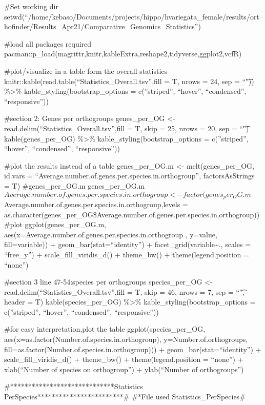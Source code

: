 \documentclass[
]{article}
\author{}
\date{\vspace{-2.5em}}
\begin{document}
\#Set working dir
setwd(``/home/kebaso/Documents/projects/hippo/hvariegata\_female/results/orthofinder/Results\_Apr21/Comparative\_Genomics\_Statistics'')

\#load all packages required
pacman::p\_load(magrittr,knitr,kableExtra,reshape2,tidyverse,ggplot2,vcfR)

\#plot/visualize in a table form the overall statistics
knitr::kable(read.table(``Statistics\_Overall.tsv'',fill = T, nrows =
24, sep = ``\t")) \%\textgreater\% kable\_styling(bootstrap\_options =
c(''striped'', ``hover'', ``condensed'', ``responsive''))

\#section 2: Genes per orthogroups genes\_per\_OG \textless-
read.delim(``Statistics\_Overall.tsv'',fill = T, skip = 25, nrows = 20,
sep = ``\t") kable(genes\_per\_OG) \%\textgreater\%
kable\_styling(bootstrap\_options = c(''striped'', ``hover'',
``condensed'', ``responsive''))

\#plot the results instead of a table genes\_per\_OG.m \textless-
melt(genes\_per\_OG, id.vars =
``Average.number.of.genes.per.species.in.orthogroup'', factorsAsStrings
= T) \#genes\_per\_OG.m
genes\_per\_OG.m\(Average.number.of.genes.per.species.in.orthogroup <- factor(genes_per_OG.m\)Average.number.of.genes.per.species.in.orthogroup,levels
=
as.character(genes\_per\_OG\$Average.number.of.genes.per.species.in.orthogroup))
\#plot ggplot(genes\_per\_OG.m,
aes(x=Average.number.of.genes.per.species.in.orthogroup , y=value,
fill=variable)) + geom\_bar(stat=``identity'') +
facet\_grid(variable\textasciitilde., scales = ``free\_y'') +
scale\_fill\_viridis\_d() + theme\_bw() + theme(legend.position =
``none'')

\#section 3 line 47-54:species per orthogroups species\_per\_OG
\textless- read.delim(``Statistics\_Overall.tsv'',fill = T, skip = 46,
nrows = 7, sep = ``\t", header = T) kable(species\_per\_OG)
\%\textgreater\% kable\_styling(bootstrap\_options = c(''striped'',
``hover'', ``condensed'', ``responsive''))

\#for easy interpretation,plot the table ggplot(species\_per\_OG,
aes(x=as.factor(Number.of.species.in.orthogroup),
y=Number.of.orthogroups,
fill=as.factor(Number.of.species.in.orthogroup))) +
geom\_bar(stat=``identity'') + scale\_fill\_viridis\_d() + theme\_bw() +
theme(legend.position = ``none'') + xlab(``Number of species on
orthogroup'') + ylab(``Number of orthogroups'')

\#*****************************Statistics
PerSpecies************************\# \#*File used
Statistics\_PerSpecies\#
\end{document}
